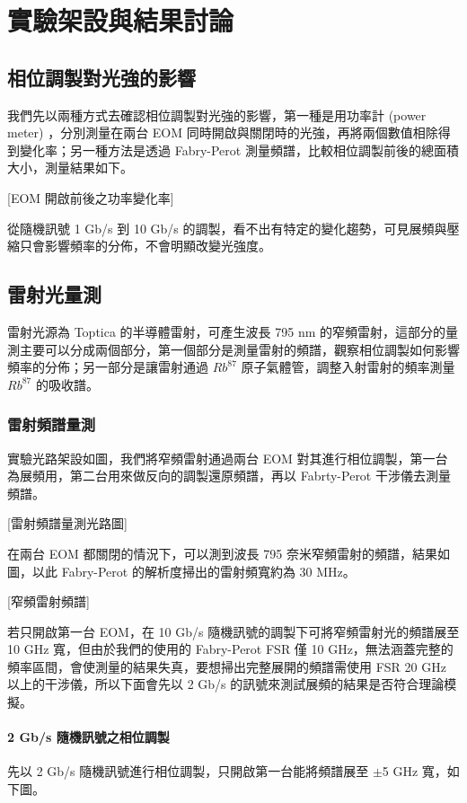 \documentclass[class=NCU_thesis, crop=false]{standalone}
\begin{document}
\chapter{實驗架設與結果討論}

\section{相位調製對光強的影響}
我們先以兩種方式去確認相位調製對光強的影響，第一種是用功率計 (power meter) ，分別測量在兩台 EOM 同時開啟與關閉時的光強，再將兩個數值相除得到變化率；另一種方法是透過 Fabry-Perot 測量頻譜，比較相位調製前後的總面積大小，測量結果如下。

[EOM 開啟前後之功率變化率]

從隨機訊號 1 Gb/s 到 10 Gb/s 的調製，看不出有特定的變化趨勢，可見展頻與壓縮只會影響頻率的分佈，不會明顯改變光強度。

\section{雷射光量測}
雷射光源為 Toptica 的半導體雷射，可產生波長 795 nm 的窄頻雷射，這部分的量測主要可以分成兩個部分，第一個部分是測量雷射的頻譜，觀察相位調製如何影響頻率的分佈；另一部分是讓雷射通過 $Rb^{87}$ 原子氣體管，調整入射雷射的頻率測量 $Rb^{87}$ 的吸收譜。

\subsection{雷射頻譜量測}

實驗光路架設如圖，我們將窄頻雷射通過兩台 EOM 對其進行相位調製，第一台為展頻用，第二台用來做反向的調製還原頻譜，再以 Fabrty-Perot 干涉儀去測量頻譜。

[雷射頻譜量測光路圖]

在兩台 EOM 都關閉的情況下，可以測到波長 795 奈米窄頻雷射的頻譜，結果如圖，以此 Fabry-Perot 的解析度掃出的雷射頻寬約為 30 MHz。

[窄頻雷射頻譜]

若只開啟第一台 EOM，在 10 Gb/s 隨機訊號的調製下可將窄頻雷射光的頻譜展至 10 GHz 寬，但由於我們的使用的 Fabry-Perot FSR 僅 10 GHz，無法涵蓋完整的頻率區間，會使測量的結果失真，要想掃出完整展開的頻譜需使用 FSR 20 GHz 以上的干涉儀，所以下面會先以 2 Gb/s 的訊號來測試展頻的結果是否符合理論模擬。

\subsubsection{2 Gb/s 隨機訊號之相位調製}
先以 2 Gb/s 隨機訊號進行相位調製，只開啟第一台能將頻譜展至 $\pm$5 GHz 寬，如下圖。
\end{document}
